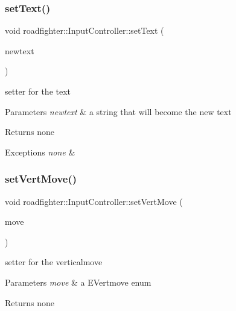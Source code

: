 \subsubsection{\texorpdfstring{set\+Text()}{setText()}}
{\footnotesize\ttfamily void roadfighter\+::\+Input\+Controller\+::set\+Text (\begin{DoxyParamCaption}\item[{const std\+::string \&}]{newtext }\end{DoxyParamCaption})}

setter for the text 
\begin{DoxyParams}{Parameters}
{\em newtext} & a string that will become the new text \\
\hline
\end{DoxyParams}
\begin{DoxyReturn}{Returns}
none 
\end{DoxyReturn}

\begin{DoxyExceptions}{Exceptions}
{\em none} & \\
\hline
\end{DoxyExceptions}
\mbox{\label{classroadfighter_1_1InputController_a02d3a5d5c84eee14ff52adb92d4367cb}} 
\subsubsection{\texorpdfstring{set\+Vert\+Move()}{setVertMove()}}
{\footnotesize\ttfamily void roadfighter\+::\+Input\+Controller\+::set\+Vert\+Move (\begin{DoxyParamCaption}\item[{E\+Vert\+Move}]{move }\end{DoxyParamCaption})}

setter for the verticalmove 
\begin{DoxyParams}{Parameters}
{\em move} & a E\+Vertmove enum \\
\hline
\end{DoxyParams}
\begin{DoxyReturn}{Returns}
none 
\end{DoxyReturn}
\mbox{\label{classroadfighter_1_1InputController_a63ba4cb79605531878f2e12f5564194a}} 
